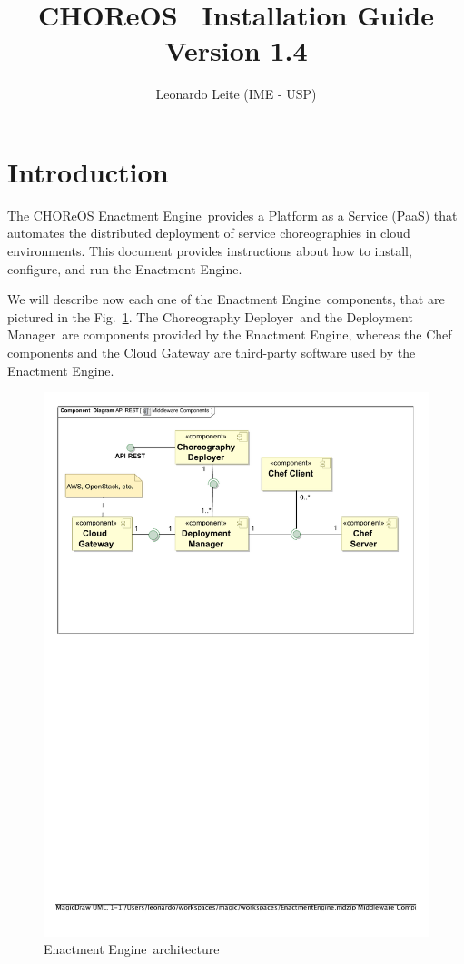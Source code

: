 \documentclass[a4paper, 10pt]{article}
\title{CHOReOS \ee\ Installation Guide \\ {\normalsize Version 1.4}}
\author{Leonardo Leite (IME - USP)}
\newcommand{\ee}{Enactment Engine}
\newcommand{\cd}{Choreography Deployer}
\newcommand{\dm}{Deployment Manager}
\begin{document}
\maketitle

\section{Introduction}

The CHOReOS \ee\ provides a Platform as a Service (PaaS) that automates the distributed deployment of service choreographies in cloud environments. This document provides instructions about how to install, configure, and run the \ee.

We will describe now each one of the \ee\ components, that are pictured in the Fig.~\ref{fig:ee_components}. The \cd\ and the \dm\ are components provided by the \ee, whereas the Chef components and the Cloud Gateway are third-party software used by the \ee.

\begin{figure}
\centering
\includegraphics[scale=0.7]{img/components.pdf}
\caption{\ee\ architecture}
\label{fig:ee_components}
\end{figure}
\end{document}
